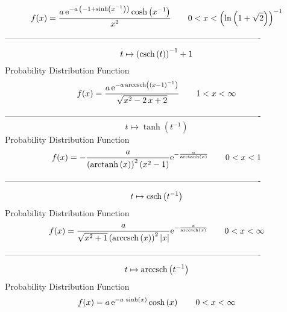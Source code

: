 \documentclass[12pt]{article}
\begin{document}
$$  f(x)={\frac {a\,{{\rm e}^{-a\, \left( -1+\sinh \left( {x}^{-1} \right) 
 \right) }}\cosh \left( {x}^{-1} \right) }{{x}^{2}}}
 \qquad0
 < x <  \left( \ln  \left( 1+\sqrt {2} \right)  \right) ^{-1}
$$-------------------------------------------------------------------------------------------  \\$$t\mapsto  \left( {\rm csch} \left(t\right) \right) ^{-1}+1
$$Probability Distribution Function 
$$  f(x)={\frac {a\,{{\rm e}^{-a\,{\rm arccsch} \left( \left( x-1 \right) ^{-1}
\right)}}}{\sqrt {{x}^{2}-2\,x+2}}}
 \qquad1
 < x < \infty 
$$-------------------------------------------------------------------------------------------  \\$$t\mapsto \tanh \left( {t}^{-1} \right) 
$$Probability Distribution Function 
$$  f(x)=-{\frac {a}{ \left( {\rm arctanh} \left(x\right) \right) ^{2} \left( {
x}^{2}-1 \right) }{{\rm e}^{-{\frac {a}{{\rm arctanh} \left(x\right)}}
}}}
 \qquad0
 < x < 1
$$-------------------------------------------------------------------------------------------  \\$$t\mapsto {\rm csch} \left({t}^{-1}\right)
$$Probability Distribution Function 
$$  f(x)={\frac {a}{\sqrt {{x}^{2}+1} \left( {\rm arccsch} \left(x\right)
 \right) ^{2} \left| x \right| }{{\rm e}^{-{\frac {a}{{\rm arccsch} 
\left(x\right)}}}}}
 \qquad0
 < x < \infty 
$$-------------------------------------------------------------------------------------------  \\$$t\mapsto {\rm arccsch} \left({t}^{-1}\right)
$$Probability Distribution Function 
$$  f(x)=a\,{{\rm e}^{-a\,\sinh \left( x \right) }}\cosh \left( x \right) 
 \qquad0
 < x < \infty 
$$
\end{document}
